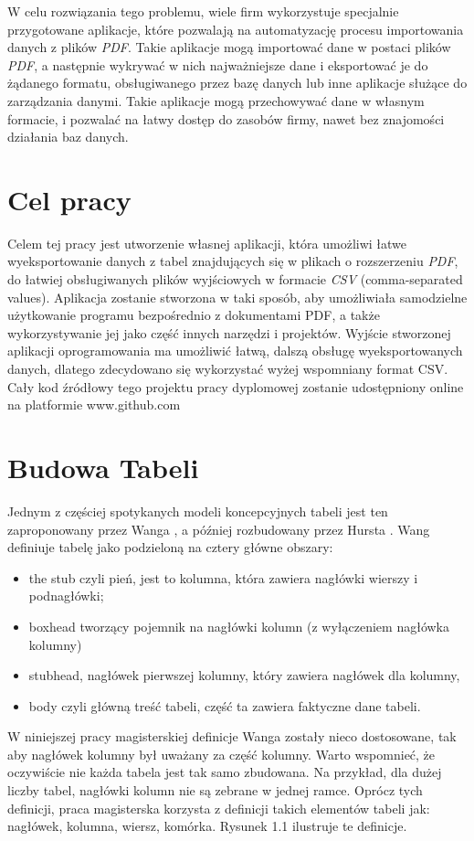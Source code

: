 \documentclass[a4paper,twoside,12pt]{book}
\begin{document}
W celu rozwiązania tego problemu, wiele firm wykorzystuje specjalnie przygotowane aplikacje, które pozwalają na automatyzację procesu importowania danych z plików \emph{PDF}. Takie aplikacje mogą importować dane w postaci plików \emph{PDF}, a następnie wykrywać w nich najważniejsze dane i eksportować je do żądanego formatu, obsługiwanego przez bazę danych lub inne aplikacje służące do zarządzania danymi. Takie aplikacje mogą przechowywać dane w własnym formacie, i pozwalać na łatwy dostęp do zasobów firmy, nawet bez znajomości działania baz danych. 

\section{Cel pracy}

Celem tej pracy jest utworzenie własnej aplikacji, która umożliwi łatwe wyeksportowanie danych z tabel znajdujących się w plikach o rozszerzeniu \emph{PDF}, do łatwiej obsługiwanych plików wyjściowych w formacie \emph{CSV} (comma-separated values). Aplikacja zostanie stworzona w taki sposób, aby umożliwiała samodzielne użytkowanie programu bezpośrednio z dokumentami PDF, a także wykorzystywanie jej jako część innych narzędzi i projektów. Wyjście stworzonej aplikacji oprogramowania ma umożliwić łatwą, dalszą obsługę wyeksportowanych danych, dlatego zdecydowano się wykorzystać wyżej wspomniany format CSV. Cały kod źródłowy tego projektu pracy dyplomowej zostanie udostępniony online na platformie www.github.com

\section{Budowa Tabeli}

Jednym z częściej spotykanych modeli koncepcyjnych tabeli jest ten zaproponowany przez Wanga \cite{bib:Wang}, a później rozbudowany przez Hursta \cite{Hurst}. Wang definiuje tabelę jako podzieloną na cztery główne obszary: 
\begin{itemize}
\item the stub czyli pień, jest to 
kolumna, która zawiera nagłówki wierszy i podnagłówki; 
\item boxhead tworzący pojemnik na nagłówki kolumn (z wyłączeniem nagłówka kolumny) 
\item stubhead, nagłówek pierwszej kolumny, który zawiera nagłówek dla kolumny, 
\item body czyli główną treść tabeli, część ta zawiera faktyczne dane tabeli. 
\end{itemize}
W niniejszej pracy magisterskiej definicje Wanga zostały nieco dostosowane, tak aby nagłówek kolumny był uważany za część kolumny. Warto wspomnieć, że oczywiście nie każda tabela jest tak samo zbudowana. Na przykład, dla dużej liczby tabel, nagłówki kolumn nie są zebrane w jednej ramce. Oprócz tych definicji, praca magisterska korzysta z definicji takich elementów tabeli jak: nagłówek, kolumna, wiersz, komórka. Rysunek 1.1 ilustruje te definicje.
\end{document}

